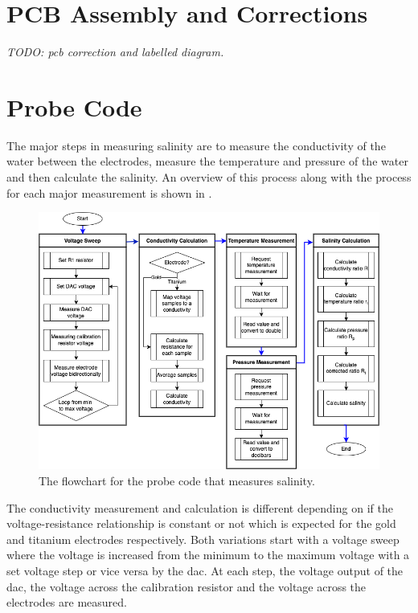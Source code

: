 \section{PCB Assembly and Corrections}

\textit{TODO: pcb correction and labelled diagram.}

\section{Probe Code}

The major steps in measuring salinity are to measure the conductivity of the water between the electrodes, measure the temperature and pressure of the water and then calculate the salinity.
An overview of this process along with the process for each major measurement is shown in .

\begin{figure}[h]
    \centering
    \includegraphics[width=1\textwidth]{Figures/probe_flowchart}
    \caption{The flowchart for the probe code that measures salinity.}
    \label{fig:probe-code-flowchart} %
\end{figure}

The conductivity measurement and calculation is different depending on if the voltage-resistance relationship is constant or not which is expected for the gold and titanium electrodes respectively.
Both variations start with a voltage sweep where the voltage is increased from the minimum to the maximum voltage with a set voltage step or vice versa by the \gls{dac}.
At each step, the voltage output of the \gls{dac}, the voltage across the calibration resistor and the voltage across the electrodes are measured.

